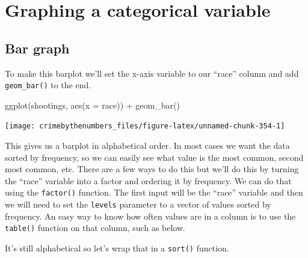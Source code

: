 \documentclass[
]{krantz}
\makeatletter
\newenvironment{Shaded}{\begin{snugshade}}{\end{snugshade}}
\newcommand{\AttributeTok}[1]{\textcolor[rgb]{0.61,0.61,0.61}{#1}}
\newcommand{\CommentTok}[1]{\textcolor[rgb]{0.37,0.37,0.37}{\textit{#1}}}
\newcommand{\FunctionTok}[1]{\textcolor[rgb]{0,0,0}{#1}}
\newcommand{\NormalTok}[1]{#1}
\newcommand{\SpecialCharTok}[1]{\textcolor[rgb]{0,0,0}{#1}}
\newenvironment{kframe}{%
\medskip{}
\setlength{\fboxsep}{.8em}
 \def\at@end@of@kframe{}%
 \ifinner\ifhmode%
  \def\at@end@of@kframe{\end{minipage}}%
  \begin{minipage}{\columnwidth}%
 \fi\fi%
 \def\FrameCommand##1{\hskip\@totalleftmargin \hskip-\fboxsep
 \colorbox{shadecolor}{##1}\hskip-\fboxsep
     \hskip-\linewidth \hskip-\@totalleftmargin \hskip\columnwidth}%
 \MakeFramed {\advance\hsize-\width
   \@totalleftmargin\z@ \linewidth\hsize
   \@setminipage}}%
 {\par\unskip\endMakeFramed%
 \at@end@of@kframe}
\renewenvironment{Shaded}{\begin{kframe}}{\end{kframe}}
\makeatother
\begin{document}
\hypertarget{graphing-a-categorical-variable}{%
\section{Graphing a categorical
variable}\label{graphing-a-categorical-variable}}

\hypertarget{bar-graph}{%
\subsection{Bar graph}\label{bar-graph}}

To make this barplot we'll set the x-axis variable to our
``race'' column and add \texttt{geom\_bar()} to the end.

\begin{Shaded}
\begin{Highlighting}[]
\FunctionTok{ggplot}\NormalTok{(shootings, }\FunctionTok{aes}\NormalTok{(}\AttributeTok{x =}\NormalTok{ race)) }\SpecialCharTok{+}
  \FunctionTok{geom\_bar}\NormalTok{()}
\end{Highlighting}
\end{Shaded}

\begin{center}\texttt{[image: crimebythenumbers\_files/figure-latex/unnamed-chunk-354-1]} \end{center}

This gives us a barplot in alphabetical order. In most cases
we want the data sorted by frequency, so we can easily see
what value is the most common, second most common, etc.
There are a few ways to do this but we'll do this by turning
the ``race'' variable into a factor and ordering it by
frequency. We can do that using the \texttt{factor()}
function. The first input will be the ``race'' variable and
then we will need to set the \texttt{levels} parameter to a
vector of values sorted by frequency. An easy way to know
how often values are in a column is to use the
\texttt{table()} function on that column, such as below.

\begin{Shaded}
\end{Shaded}

It's still alphabetical so let's wrap that in a
\texttt{sort()} function.
\end{document}
